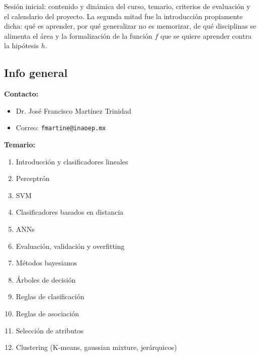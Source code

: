 \documentclass[11pt,letterpaper]{article}
\newcommand{\profesor}{Dr. José Francisco Martínez Trinidad}
\begin{document}

\portadilla
\newpage



\begin{quick_sum}
  Sesión inicial: contenido y dinámica del curso, temario, criterios
  de evaluación y el calendario del proyecto. La segunda mitad fue la
  introducción propiamente dicha: qué es aprender, por qué generalizar
  no es memorizar, de qué disciplinas se alimenta el área y la
  formalización de la función $f$ que se quiere aprender contra la
  hipótesis $h$.
\end{quick_sum}

\subsection*{Info general}

\textbf{Contacto:}
\begin{itemize}[itemsep=0.1em]
    \item \profesor
    \item Correo: \texttt{fmartine@inaoep.mx}
\end{itemize}

\textbf{Temario:}
\begin{enumerate}[itemsep=0.1em]
    \item Introducción y clasificadores lineales
    \item Perceptrón
    \item SVM
    \item Clasificadores basados en distancia
    \item ANNs
    \item Evaluación, validación y overfitting
    \item Métodos bayesianos
    \item Árboles de decisión
    \item Reglas de clasificación
    \item Reglas de asociación
    \item Selección de atributos
    \item Clustering (K-means, gaussian mixture, jerárquicos)
\end{enumerate}
\end{document}

